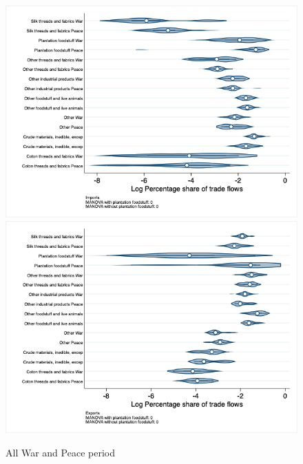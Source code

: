 \documentclass[12pt,a4paper,notitlepage,english]{article}
\begin{document}
\begin{figure}
\caption{All War and Peace period}
\label{peace_war_nat_distr_aggr}
\includegraphics[scale=.4]{peace_war_nat_distr_Iaggr}
\includegraphics[scale=.4]{peace_war_nat_distr_Xaggr}
\end{figure}
\end{document}
